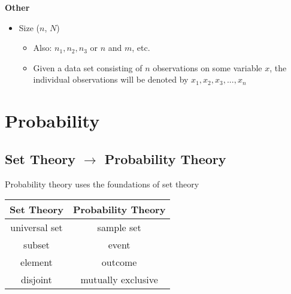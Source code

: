 \documentclass[12pt]{article}
\begin{document}
    \noindent \textbf{Other}
    \begin{itemize}
        \item Size (\(n\), \(N\))
        \begin{itemize}
            \item Also: $n_1, n_2, n_3$ or \(n\) and \(m\), etc.
            \item Given a data set consisting of \(n\) observations on some variable \(x\), the individual observations will be denoted by $x_1, x_2, x_3, ..., x_n$
       \end{itemize}    
    \end{itemize}  

\section{Probability}

\subsection{Set Theory $\longrightarrow$ Probability Theory}
\begin{description}
    \item[Probability theory uses the foundations of set theory] 
\end{description}

\begin{center}
    \begin{tabular}{c|c}
        Set Theory & Probability Theory \\
        \hline
        universal set & sample set \\
        subset & event \\
        element & outcome \\
        disjoint & mutually exclusive \\
    \end{tabular}
\end{center}
\end{document}
